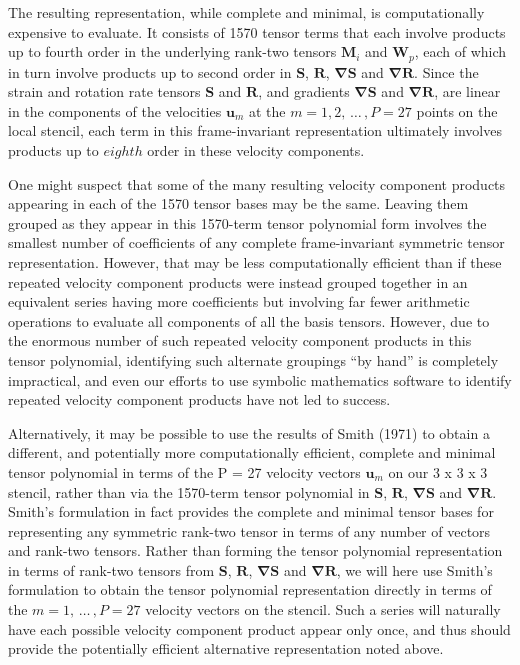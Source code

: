 The resulting representation, while complete and minimal, is computationally expensive to evaluate.  It consists of 1570 tensor terms that each involve products up to fourth order in the underlying rank-two tensors $\mathbf{M}_i$ and $\mathbf{W}_p$, each of which in turn involve products up to second order in $\mathbf{S}$, $\mathbf{R}$, $\mathbf{\nabla S}$ and $\mathbf{\nabla R}$. Since the strain and rotation rate tensors $\mathbf{S}$ and $\mathbf{R}$, and gradients $\mathbf{\nabla S}$ and $\mathbf{\nabla R}$, are linear in the components of the velocities $\mathbf{u}_m$  at the $m = 1, 2, \,\dots\, , P = 27$ points on the local  stencil, each term in this frame-invariant representation ultimately involves products up to $eighth$ order in these velocity components.  


One might suspect that some of the many resulting velocity component products appearing in each of the 1570 tensor bases may be the same. Leaving them grouped as they appear in this 1570-term tensor polynomial form involves the smallest number of coefficients of any complete frame-invariant symmetric tensor representation. However, that may be less computationally efficient than if these repeated velocity component products were instead grouped together in an equivalent series having more coefficients but involving far fewer arithmetic operations to evaluate all components of all the basis tensors. However, due to the enormous number of such repeated velocity component products in this tensor polynomial, identifying such alternate groupings “by hand” is completely impractical, and even our efforts to use symbolic mathematics software to identify repeated velocity component products have not led to success.

Alternatively, it may be possible to use the results of Smith (1971) to obtain a different, and potentially more computationally efficient, complete and minimal tensor polynomial in terms of the P = 27 velocity vectors $\mathbf{u}_m$ on our 3 x 3 x 3   stencil, rather than via the 1570-term tensor polynomial in $\mathbf{S}$, $\mathbf{R}$, $\mathbf{\nabla S}$ and $\mathbf{\nabla R}$. Smith’s formulation in fact provides the complete and minimal tensor bases for representing any symmetric rank-two tensor in terms of any number of vectors and rank-two tensors.  Rather than forming the tensor polynomial representation in terms of rank-two tensors from $\mathbf{S}$, $\mathbf{R}$, $\mathbf{\nabla S}$ and $\mathbf{\nabla R}$, we will here use Smith’s formulation to obtain the tensor polynomial representation directly in terms of the $m = 1, \,\dots\, , P = 27$ velocity vectors   on the stencil.  Such a series will naturally have each possible velocity component product appear only once, and thus should provide the potentially efficient alternative representation noted above.

